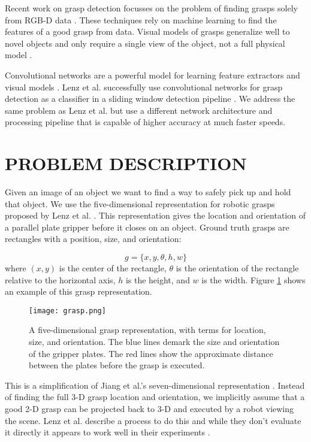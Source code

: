 \documentclass[letterpaper, 10 pt, conference]{ieeeconf}
\begin{document}
Recent work on grasp detection focusses on the problem of finding grasps solely from RGB-D data \cite{saxena2008robotic}. These techniques rely on machine learning to find the features of a good grasp from data. Visual models of grasps generalize well to novel objects and only require a single view of the object, not a full physical model \cite{rao2010grasping} \cite{jiang2011efficient}.

Convolutional networks are a powerful model for learning feature extractors and visual models \cite{krizhevsky2012imagenet} \cite{girshick14CVPR}. Lenz et al. successfully use convolutional networks for grasp detection as a classifier in a sliding window detection pipeline \cite{lenz2013deep}. We address the same problem as Lenz et al. but use a different network architecture and processing pipeline that is capable of higher accuracy at much faster speeds.
   
\section{PROBLEM DESCRIPTION}

Given an image of an object we want to find a way to safely pick up and hold that object. We use the five-dimensional representation for robotic grasps proposed by Lenz et al. \cite{lenz2013deep}. This representation gives the location and orientation of a parallel plate gripper before it closes on an object. Ground truth grasps are rectangles with a position, size, and orientation:

\[g = \{x,y,\theta,h,w\}\]
where $(x,y)$ is the center of the rectangle, $\theta$ is the orientation of the rectangle relative to the horizontal axis, $h$ is the height, and $w$ is the width. Figure \ref{grasp} shows an example of this grasp representation.

   \begin{figure}[thpb]
      \centering
        \texttt{[image: grasp.png]}
      \caption{A five-dimensional grasp representation, with terms for location, size, and orientation. The blue lines demark the size and orientation of the gripper plates. The red lines show the approximate distance between the plates before the grasp is executed.}
      \label{grasp}
   \end{figure}


This is a simplification of Jiang et al.'s seven-dimensional representation \cite{jiang2011efficient}. Instead of finding the full 3-D grasp location and orientation, we implicitly assume that a good 2-D grasp can be projected back to 3-D and executed by a robot viewing the scene. Lenz et al. describe a process to do this and while they don't evaluate it directly it appears to work well in their experiments \cite{lenz2013deep}.
\end{document}
